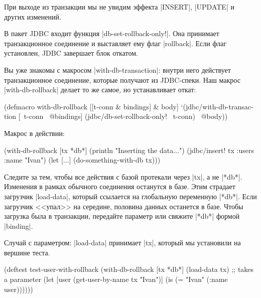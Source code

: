 При выходе из транзакции мы не увидим эффекта \spverb|INSERT|, \spverb|UPDATE| и
других изменений.

В пакет JDBC входит функция \spverb|db-set-rollback-only!|. Она принимает
транзакционное соединение и выставляет ему флаг \spverb|rollback|. Если флаг
установлен, JDBC завершает блок откатом.


Вы уже знакомы с макросом \spverb|with-db-transaction|: внутри него действует
транзакционное соединение, которые получают из JDBC-спеки. Наш макрос
\spverb|with-db-rollback| делает то же самое, но устанавливает откат:

\begin{english}
  \begin{clojure}
(defmacro with-db-rollback
  [[t-conn & bindings] & body]
  `(jdbc/with-db-transaction [~t-conn ~@bindings]
     (jdbc/db-set-rollback-only! ~t-conn)
     ~@body))
  \end{clojure}
\end{english}

\noindent
Макрос в действии:

\begin{english}
  \begin{clojure}
(with-db-rollback [tx *db*]
  (println "Inserting the data...")
  (jdbc/insert! tx :users {:name "Ivan"})
  (let [...]
    (do-something-with-db tx)))
  \end{clojure}
\end{english}

Следите за тем, чтобы все действия с базой протекали через \spverb|tx|, а не
\spverb|*db*|. Изменения в рамках обычного соединения останутся в базе. Этим
страдает загрузчик \spverb|load-data|, который ссылается на глобальную
переменную \spverb|*db*|. Если загрузчик <<упал>> на середине, половина данных
останется в базе. Чтобы загрузка была в транзакции, передайте параметр или
свяжите \spverb|*db*| формой \spverb|binding|.

Случай с параметром: \spverb|load-data| принимает \spverb|tx|, который мы
установили на вершине теста.

\begin{english}
  \begin{clojure}
(deftest test-user-with-rollback
  (with-db-rollback [tx *db*]
    (load-data tx) ;; takes a parameter
    (let [user (get-user-by-name tx "Ivan")]
      (is (= "Ivan" (:name user))))))
  \end{clojure}
\end{english}


